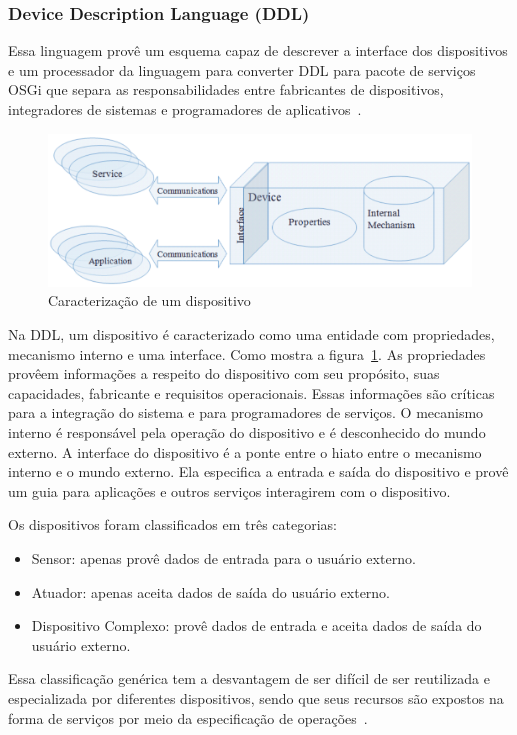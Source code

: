 \subsubsection{Device Description Language (DDL)}
\label{subsec:ddl}

Essa linguagem provê um esquema capaz de descrever a interface dos dispositivos e um processador da linguagem para converter DDL para pacote de serviços OSGi que separa as responsabilidades entre fabricantes de dispositivos, integradores de sistemas e programadores de aplicativos~\cite{gatorTechDDL}.

\begin{figure}[ht]
\center
\includegraphics[scale=0.4]{imagens/gatorDDL}
\caption{Caracterização de um dispositivo~\cite{ddlSpec}}
\label{fig:ddlspec}
\end{figure}

Na DDL, um dispositivo é caracterizado como uma entidade com propriedades, mecanismo interno e uma interface. Como mostra a figura~\ref{fig:ddlspec}. As propriedades provêem informações a respeito do dispositivo com seu propósito, suas capacidades, fabricante e requisitos operacionais. Essas informações são críticas para a integração do sistema e para programadores de serviços. O mecanismo interno é responsável pela operação do dispositivo e é desconhecido do mundo externo. A interface do dispositivo é a ponte entre o hiato entre o mecanismo interno e o mundo externo. Ela especifica a entrada e saída do dispositivo e provê um guia para aplicações e outros serviços interagirem com o dispositivo.

Os dispositivos foram classificados em três categorias:
\begin{itemize}
	\item Sensor: apenas provê dados de entrada para o usuário externo.
	\item Atuador: apenas aceita dados de saída do usuário externo.
	\item Dispositivo Complexo: provê dados de entrada e aceita dados de saída do usuário externo.
\end{itemize}

Essa classificação genérica tem a desvantagem de ser difícil de ser reutilizada e especializada por diferentes dispositivos, sendo que seus recursos são expostos na forma de serviços por meio da especificação de operações~\cite{ddlSpec}.
